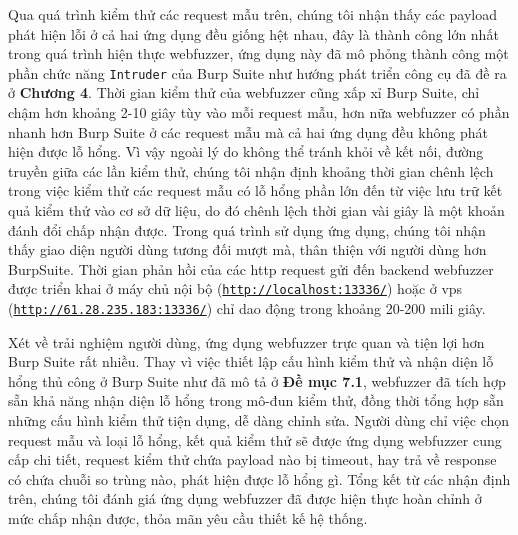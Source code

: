 Qua quá trình kiểm thử các request mẫu trên, chúng tôi nhận thấy các payload phát hiện lỗi ở cả hai ứng dụng đều giống hệt nhau, đây là thành công lớn nhất trong quá trình hiện thực webfuzzer, ứng dụng này đã mô phỏng thành công một phần chức năng \texttt{Intruder} của Burp Suite như hướng phát triển công cụ đã đề ra ở \textbf{Chương 4}. Thời gian kiểm thử của webfuzzer cũng xấp xỉ Burp Suite, chỉ chậm hơn khoảng 2-10 giây tùy vào mỗi request mẫu, hơn nữa webfuzzer có phần nhanh hơn Burp Suite ở các request mẫu mà cả hai ứng dụng đều không phát hiện được lỗ hổng. Vì vậy ngoài lý do không thể tránh khỏi về kết nối, đường truyền giữa các lần kiểm thử, chúng tôi nhận định khoảng thời gian chênh lệch trong việc kiểm thử các request mẫu có lỗ hổng phần lớn đến từ việc lưu trữ kết quả kiểm thử vào cơ sở dữ liệu, do đó chênh lệch thời gian vài giây là một khoản đánh đổi chấp nhận được. Trong quá trình sử dụng ứng dụng, chúng tôi nhận thấy giao diện người dùng tương đối mượt mà, thân thiện với người dùng hơn BurpSuite. Thời gian phản hồi của các \acrshort{http} request gửi đến backend webfuzzer được triển khai ở máy chủ nội bộ (\href{http://localhost:13336/}{\texttt{http://localhost:13336/}}) hoặc ở \acrshort{vps} (\href{http://61.28.235.183:13336/}{\texttt{http://61.28.235.183:13336/}}) chỉ dao động trong khoảng 20-200 mili giây.\par
Xét về trải nghiệm người dùng, ứng dụng webfuzzer trực quan và tiện lợi hơn Burp Suite rất nhiều. Thay vì việc thiết lập cấu hình kiểm thử và nhận diện lỗ hổng thủ công ở Burp Suite như đã mô tả ở \textbf{Đề mục 7.1}, webfuzzer đã tích hợp sẵn khả năng nhận diện lỗ hổng trong mô-đun kiểm thử, đồng thời tổng hợp sẵn những cấu hình kiểm thử tiện dụng, dễ dàng chỉnh sửa. Người dùng chỉ việc chọn request mẫu và loại lỗ hổng, kết quả kiểm thử sẽ được ứng dụng webfuzzer cung cấp chi tiết, request kiểm thử chứa payload nào bị timeout, hay trả về response có chứa chuỗi so trùng nào, phát hiện được lỗ hổng gì. Tổng kết từ các nhận định trên, chúng tôi đánh giá ứng dụng webfuzzer đã được hiện thực hoàn chỉnh ở mức chấp nhận được, thỏa mãn yêu cầu thiết kế hệ thống.